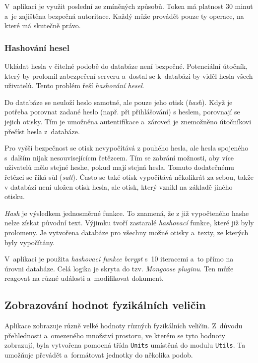 \documentclass[a4paper,12pt]{article}
\def\code#1{\texttt{#1}}
\begin{document}
V~aplikaci je využit poslední ze zmíněných způsobů. Token má platnost 30 minut a~je zajištěna bezpečná autoritace. Každý může provádět pouze ty operace, na které má skutečně právo.

\subsubsection{Hashování hesel}

Ukládat hesla v čitelné podobě do databáze není bezpečné. Potenciální útočník, který by prolomil zabezpečení serveru a~dostal se k~databázi by viděl hesla všech uživatelů. Tento problém řeší \textit{hashování hesel}.

Do databáze se neuloží heslo samotné, ale pouze jeho otisk (\textit{hash}). Když je potřeba porovnat zadané heslo (např. při přihlášování) s heslem, porovnají se jejich otisky. Tím je umožněna autentifikace a~zároveň je znemožněno útočníkovi přečíst hesla z~databáze.

Pro vyšší bezpečnost se otisk nevypočítává z pouhého hesla, ale hesla spojeného s~dalším nijak nesouvisejícícm řetězcem. Tím se zabrání možnosti, aby více uživatelů mělo stejné heshe, pokud mají stejná hesla. Tomuto dodatečnému řetězci se říká sůl (\textit{salt}). Často se také otisk vypočítává několikrát za sebou, takže v databázi není uložen otisk hesla, ale otisk, který vznikl na základě jiného otisku.

\textit{Hash} je výsledkem jednosměrné funkce. To znamená, že z již vypočteného hashe nelze získat původní text. Výjimku tvoří zastaralé \textit{hashovací} funkce, které již byly prolomeny. Je vytvořena databáze pro všechny možné otisky a~texty, ze kterých byly vypočítány.

V~aplikaci je použita \textit{hashovací funkce bcrypt} s~10 iteracemi a~to přímo na úrovni databáze. Celá logika je skryta do tzv. \textit{Mongoose pluginu}. Ten může reagovat na různé události a~modifikovat dokument.



\subsection{Zobrazování hodnot fyzikálních veličin}

Aplikace zobrazuje různě velké hodnoty různých fyzikálních veličin. Z~důvodu přehlednosti a~omezeného množství prostoru, ve kterém se tyto hodnoty zobrazují, byla vytvořena pomocná třída \code{Units} umístěná do modulu \code{Utils}. Ta umožňuje převádět a~formátovat jednotky do několika podob.
\end{document}

